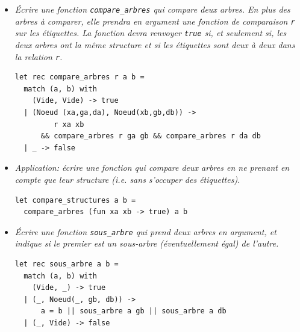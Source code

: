 \documentclass[11pt, a4paper]{article}
\begin{document}
\begin{itemize}
        \smallskip

\begin{verbatim}
let rec préfixe a = match a with
  Vide -> []
| Noeud(x, g, d) -> x :: ((préfixe g) @ (préfixe d))

let rec infixe a = match a with
  Vide -> []
| Noeud(x, g, d) -> (infixe g) @ (x :: (infixe d))

let rec suffixe a = match a with
  Vide -> []
| Noeud(x, g, d) -> (suffixe g) @ (suffixe d) @ [x]
\end{verbatim}

        \medskip

        Note: il est possible d'écrire les fonctions de parcours ({\tt
        préfixe}, {\tt infixe} et {\tt suffixe}) de façon plus
        efficace. Les versions ci-dessus présentent l'avantage d'être
        très lisibles.

  \item \emph{Écrire une fonction {\tt compare\_arbres} qui compare
        deux arbres. En plus des arbres à comparer, elle prendra en
        argument une fonction de comparaison {\tt r} sur les
        étiquettes. La fonction devra renvoyer {\tt true} si, et
        seulement si, les deux arbres ont la même structure et si les
        étiquettes sont deux à deux dans la relation {\tt r}.}

        \smallskip

        \begin{verbatim}
let rec compare_arbres r a b =
  match (a, b) with
    (Vide, Vide) -> true
  | (Noeud (xa,ga,da), Noeud(xb,gb,db)) ->
         r xa xb
      && compare_arbres r ga gb && compare_arbres r da db
  | _ -> false
\end{verbatim}

        \medskip

  \item \emph{Application: écrire une fonction qui compare deux arbres
        en ne prenant en compte que leur structure (i.e.  sans
        s'occuper des étiquettes).}

        \smallskip

\begin{verbatim}
let compare_structures a b =
  compare_arbres (fun xa xb -> true) a b
\end{verbatim}

        \smallskip

  \item \emph{Écrire une fonction {\tt sous\_arbre} qui prend deux
        arbres en argument, et indique si le premier est un sous-arbre
        (éventuellement égal) de l'autre.}

        \smallskip

\begin{verbatim}
let rec sous_arbre a b =
  match (a, b) with
    (Vide, _) -> true
  | (_, Noeud(_, gb, db)) ->
      a = b || sous_arbre a gb || sous_arbre a db
  | (_, Vide) -> false
\end{verbatim}

\end{itemize}
\end{document}
